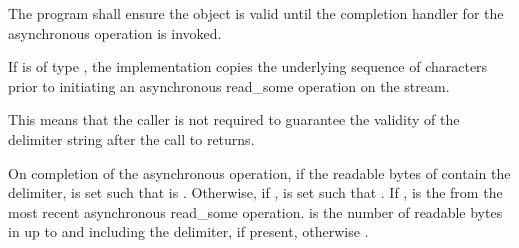 \begin{itemdescr}
\pnum
The program shall ensure the  object  is valid until the completion handler for the asynchronous operation is invoked.

\pnum
If  is of type , the implementation copies the underlying sequence of characters prior to initiating an asynchronous read_some operation on the stream. \begin{note} This means that the caller is not required to guarantee the validity of the delimiter string after the call to  returns. \end{note}

\pnum
On completion of the asynchronous operation, if the readable bytes of  contain the delimiter,  is set such that  is . Otherwise, if ,  is set such that . If ,  is the  from the most recent asynchronous read_some operation.  is the number of readable bytes in  up to and including the delimiter, if present, otherwise .
\end{itemdescr}



